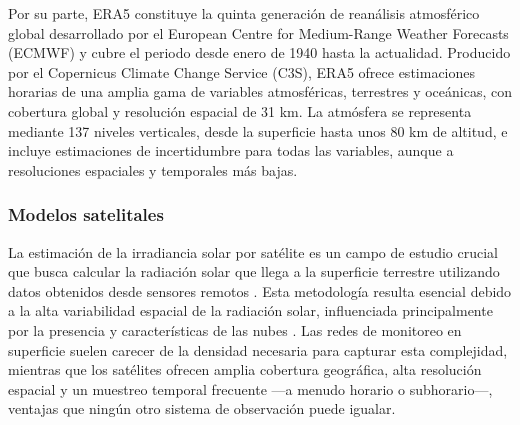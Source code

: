 Por su parte, ERA5 constituye la quinta generación de reanálisis atmosférico global desarrollado por el European Centre for Medium-Range Weather Forecasts (ECMWF) y cubre el periodo desde enero de 1940 hasta la actualidad. Producido por el Copernicus Climate Change Service (C3S), ERA5 ofrece estimaciones horarias de una amplia gama de variables atmosféricas, terrestres y oceánicas, con cobertura global y resolución espacial de 31 km. La atmósfera se representa mediante 137 niveles verticales, desde la superficie hasta unos 80 km de altitud, e incluye estimaciones de incertidumbre para todas las variables, aunque a resoluciones espaciales y temporales más bajas.




\subsubsection{Modelos satelitales}

La estimación de la irradiancia solar por satélite es un campo de estudio crucial que busca calcular la radiación solar que llega a la superficie terrestre utilizando datos obtenidos desde sensores remotos \cite{Hay1993, ALONSOSUAREZ2012}. Esta metodología resulta esencial debido a la alta variabilidad espacial de la radiación solar, influenciada principalmente por la presencia y características de las nubes \cite{Laguarda2022}. Las redes de monitoreo en superficie suelen carecer de la densidad necesaria para capturar esta complejidad, mientras que los satélites ofrecen amplia cobertura geográfica, alta resolución espacial y un muestreo temporal frecuente —a menudo horario o subhorario—, ventajas que ningún otro sistema de observación puede igualar.

